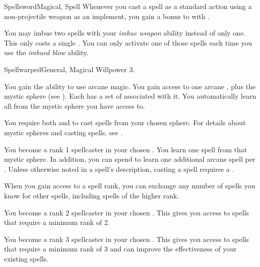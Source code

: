 \begin{feat}{Spellsword}{Magical, Spell}
         Whenever you cast a spell as a standard action using a non-projectile weapon as an implement, you  gain a  bonus to  with .

         You may imbue two spells with your \textit{imbue weapon} ability instead of only one.
        This only costs a single .
        You can only activate one of those spells each time you use the \textit{imbued blow} ability.
    \end{feat}

    \begin{feat}{Spellwarped}{General, Magical}
        \featpre Willpower 3.

         You gain the ability to use arcane magic.
        You gain access to one arcane , plus the  mystic sphere (see ).
        Each  has a set of  associated with it.
        You automatically learn all  from the mystic sphere you have access to.

        You require both  and  to cast spells from your chosen sphere.
        For details about mystic spheres and casting spells, see .

         You become a rank 1 spellcaster in your chosen .
        You learn one spell from that mystic sphere.
        In addition, you can spend  to learn one additional arcane spell per .
        Unless otherwise noted in a spell's description, casting a spell requires a .

        When you gain access to a spell rank,
            you can exchange any number of spells you know for other spells,
            including spells of the higher rank.

         You become a rank 2 spellcaster in your chosen .
        This gives you access to spells that require a minimum rank of 2.

         You become a rank 3 spellcaster in your chosen .
        This gives you access to spells that require a minimum rank of 3 and can improve the effectiveness of your existing spells.


\end{feat}
